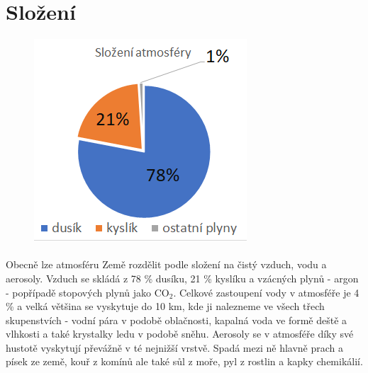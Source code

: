 \documentclass[11pt]{article}
\begin{document}
\section{Složení}
%
\begin{figure}
 \centering
 \vspace{-2em}
\includegraphics[width=\linewidth]{resources/graf2}
\end{figure}
%
\paragraph{}
Obecně lze atmosféru Země rozdělit podle složení na čistý vzduch, vodu a aerosoly. Vzduch se skládá z 78 \% dusíku, 21 \% kyslíku a vzácných plynů - argon - popřípadě stopových plynů jako $\textrm{CO}_2$. Celkové zastoupení vody v atmosféře je 4 \% a velká většina se vyskytuje do 10 km, kde ji nalezneme ve všech třech skupenstvích - vodní pára v podobě oblačnosti, kapalná voda ve formě deště a vlhkosti a také krystalky ledu v podobě sněhu. Aerosoly se v atmosféře díky své hustotě vyskytují převážně v té nejnižší vrstvě. Spadá mezi ně hlavně prach a písek ze země, kouř z komínů ale také sůl z moře, pyl z rostlin a kapky chemikálií.
%
\end{document}
